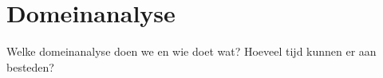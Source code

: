 
\section{Domeinanalyse}

Welke domeinanalyse doen we en wie doet wat? Hoeveel tijd kunnen er aan besteden?
